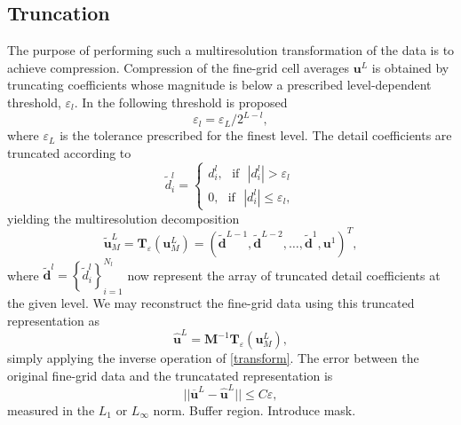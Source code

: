 \documentclass[]{article}
\begin{document}
    \subsection{Truncation}

        The purpose of performing such a multiresolution transformation of the
        data is to achieve compression. Compression of the fine-grid cell
        averages $\bm{u}^{L}$ is obtained by truncating coefficients whose
        magnitude is below a prescribed level-dependent threshold,
        $\varepsilon_{l}$.  In \cite{harten1994} the following threshold is
        proposed
        \begin{equation}
            \varepsilon_{l} = \varepsilon_{L} / 2^{L-l},
        \end{equation}
        where $\varepsilon_{L}$ is the tolerance prescribed for the finest
        level. The detail coefficients are truncated according to
        \begin{equation}
            \tilde{d}^{l}_{i} =
                \begin{cases}
                    d^{l}_{i}, \text{ } \text{if} \text{ } |d^{l}_{i}| > \varepsilon_{l} \\
                    0, \text{ } \text{if} \text{ } |d^{l}_{i}| \leq
                    \varepsilon_{l},
                \end{cases}
        \end{equation}
        yielding the multiresolution decomposition
        \begin{equation}
            \tilde{\bm{u}}^{L}_{M} = \bm{T}_{\varepsilon}(\bm{u}^{L}_{M}) = \left(
            \tilde{\bm{d}}^{L-1}, \tilde{\bm{d}}^{L-2},
            \dots, \tilde{\bm{d}}^{1}, \bm{u}^{1} \right)^{T},
        \end{equation}
        where $\tilde{\bm{d}}^{l} =
        \left\{\tilde{d}^{l}_{i}\right\}_{i=1}^{N_{l}}$ now represent the array
        of truncated detail coefficients at the given level. We may reconstruct
        the fine-grid data using this truncated representation as
        \begin{equation}
            \hat{\bm{u}}^{L} = \bm{M}^{-1} \bm{T}_{\varepsilon}(\bm{u}^{L}_{M}),
        \end{equation}
        simply applying the inverse operation of \ref{transform}.  The error
        between the original fine-grid data and the truncatated representation
        is
        \begin{equation}
            ||\overline{\bm{u}}^{L} - \hat{\bm{u}}^{L}|| \leq C \varepsilon,
            \label{bound}
        \end{equation}
        measured in the $L_{1}$ or $L_{\infty}$ norm. Buffer region. Introduce mask.
\end{document}
